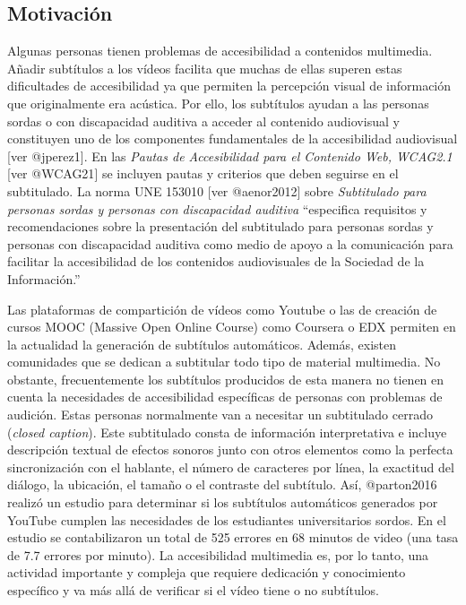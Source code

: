 \documentclass[
  letterpaper,
  DIV=11,
  numbers=noendperiod]{scrartcl}
\author{}
\date{}
\begin{document}
\ifdefined\Shaded\renewenvironment{Shaded}{\begin{tcolorbox}[breakable, interior hidden, borderline west={3pt}{0pt}{shadecolor}, sharp corners, frame hidden, enhanced, boxrule=0pt]}{\end{tcolorbox}}\fi

\hypertarget{motivaciuxf3n}{%
\subsection{Motivación}\label{motivaciuxf3n}}

Algunas personas tienen problemas de accesibilidad a contenidos
multimedia. Añadir subtítulos a los vídeos facilita que muchas de ellas
superen estas dificultades de accesibilidad ya que permiten la
percepción visual de información que originalmente era acústica. Por
ello, los subtítulos ayudan a las personas sordas o con discapacidad
auditiva a acceder al contenido audiovisual y constituyen uno de los
componentes fundamentales de la accesibilidad audiovisual {[}ver
@jperez1{]}. En las \emph{Pautas de Accesibilidad para el Contenido Web,
WCAG2.1} {[}ver @WCAG21{]} se incluyen pautas y criterios que deben
seguirse en el subtitulado. La norma UNE 153010 {[}ver @aenor2012{]}
sobre \emph{Subtitulado para personas sordas y personas con discapacidad
auditiva} ``especifica requisitos y recomendaciones sobre la
presentación del subtitulado para personas sordas y personas con
discapacidad auditiva como medio de apoyo a la comunicación para
facilitar la accesibilidad de los contenidos audiovisuales de la
Sociedad de la Información.''

Las plataformas de compartición de vídeos como Youtube o las de creación
de cursos MOOC (Massive Open Online Course) como Coursera o EDX permiten
en la actualidad la generación de subtítulos automáticos. Además,
existen comunidades que se dedican a subtitular todo tipo de material
multimedia. No obstante, frecuentemente los subtítulos producidos de
esta manera no tienen en cuenta la necesidades de accesibilidad
específicas de personas con problemas de audición. Estas personas
normalmente van a necesitar un subtitulado cerrado (\emph{closed
caption}). Este subtitulado consta de información interpretativa e
incluye descripción textual de efectos sonoros junto con otros elementos
como la perfecta sincronización con el hablante, el número de caracteres
por línea, la exactitud del diálogo, la ubicación, el tamaño o el
contraste del subtítulo. Así, @parton2016 realizó un estudio para
determinar si los subtítulos automáticos generados por YouTube cumplen
las necesidades de los estudiantes universitarios sordos. En el estudio
se contabilizaron un total de 525 errores en 68 minutos de video (una
tasa de 7.7 errores por minuto). La accesibilidad multimedia es, por lo
tanto, una actividad importante y compleja que requiere dedicación y
conocimiento específico y va más allá de verificar si el vídeo tiene o
no subtítulos.
\end{document}
